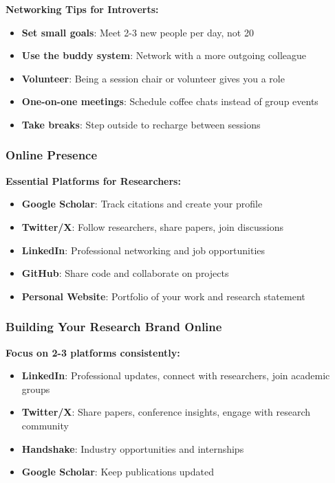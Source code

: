 \documentclass[11pt,a4paper]{article}
\begin{document}
\textbf{Networking Tips for Introverts:}
\begin{itemize}
    \item \textbf{Set small goals}: Meet 2-3 new people per day, not 20
    \item \textbf{Use the buddy system}: Network with a more outgoing colleague
    \item \textbf{Volunteer}: Being a session chair or volunteer gives you a role
    \item \textbf{One-on-one meetings}: Schedule coffee chats instead of group events
    \item \textbf{Take breaks}: Step outside to recharge between sessions
\end{itemize}

\subsubsection{Online Presence}

\textbf{Essential Platforms for Researchers:}
\begin{itemize}
    \item \textbf{Google Scholar}: Track citations and create your profile
    \item \textbf{Twitter/X}: Follow researchers, share papers, join discussions
    \item \textbf{LinkedIn}: Professional networking and job opportunities
    \item \textbf{GitHub}: Share code and collaborate on projects
    \item \textbf{Personal Website}: Portfolio of your work and research statement
\end{itemize}

\subsubsection{Building Your Research Brand Online}

\begin{tcolorbox}[colback=green!5,colframe=green!50,title={\faUsers~Strategic Platform Use}]
\textbf{Focus on 2-3 platforms consistently:}
\begin{itemize}[leftmargin=1.5em]
    \item \textbf{LinkedIn}: Professional updates, connect with researchers, join academic groups
    \item \textbf{Twitter/X}: Share papers, conference insights, engage with research community
    \item \textbf{Handshake}: Industry opportunities and internships
    \item \textbf{Google Scholar}: Keep publications updated
\end{itemize}
\end{tcolorbox}
\end{document}
